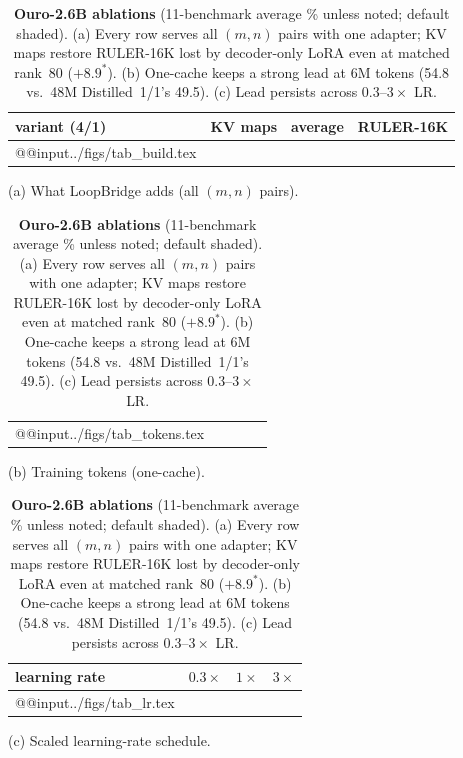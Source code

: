 \documentclass[11pt]{article}
\begin{document}
\begin{table}[t]
\centering\footnotesize
\setlength\tabcolsep{3.8pt}
\begin{minipage}[c]{0.60\textwidth}\centering
\begin{tabular}{@{}lccc@{}}
\toprule
variant (4/1) & KV maps & average & RULER-16K \\
\midrule
\csname @@input\endcsname ../figs/tab_build.tex
\bottomrule
\end{tabular}
\par\smallskip(a) What LoopBridge adds (all $(m,n)$ pairs).
\end{minipage}\hfill
\begin{minipage}[c]{0.38\textwidth}\centering
\begin{tabular}{lcccc}
\toprule
\csname @@input\endcsname ../figs/tab_tokens.tex
\bottomrule
\end{tabular}
\par\smallskip(b) Training tokens (one-cache).

\smallskip
\begin{tabular}{lccc}
\toprule
learning rate & $0.3\times$ & $1\times$ & $3\times$ \\
\midrule
\csname @@input\endcsname ../figs/tab_lr.tex
\bottomrule
\end{tabular}
\par\smallskip(c) Scaled learning-rate schedule.
\end{minipage}
\caption{\textbf{Ouro-2.6B ablations} (11-benchmark average \% unless noted; default shaded). (a) Every row serves all
$(m,n)$ pairs with one adapter; KV maps restore RULER-16K lost by decoder-only LoRA even at matched rank~80 ($+8.9^\ast$).
(b) One-cache keeps a strong lead at 6M tokens (54.8 vs.\ 48M Distilled~1/1's 49.5). (c) Lead persists across
$0.3$--$3\times$ LR.}
\label{tab:ablate}
\end{table}
\end{document}
